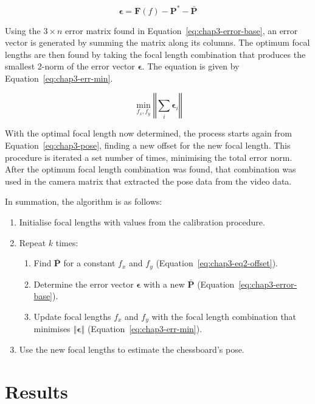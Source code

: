\begin{equation}
  \label{eq:chap3-error-base}
  \bm{\epsilon} = \bm{F}(f) - \bm{P}^* - \bar{\bm{P}}
\end{equation}

Using the $3\times n$ error matrix found in Equation~\ref{eq:chap3-error-base}, an error vector is generated by summing the matrix along its columns. The optimum focal lengths are then found by taking the focal length combination that produces the smallest 2-norm of the error vector $\bm{\epsilon}$. The equation is given by Equation~\ref{eq:chap3-err-min}.

\begin{equation}
  \label{eq:chap3-err-min}
  \min_{f_x, f_y}\left \Vert \sum_i  \bm{\epsilon}_i \right \Vert
\end{equation}

With the optimal focal length now determined, the process starts again from Equation~\ref{eq:chap3-pose}, finding a new offset for the new focal length. This procedure is iterated a set number of times, minimising the total error norm. After the optimum focal length combination was found, that combination was used in the camera matrix that extracted the pose data from the video data.

In summation, the algorithm is as follows:

\begin{enumerate}
  \item Initialise focal lengths with values from the calibration procedure. 
  \item Repeat $k$ times:
  \begin{enumerate}
    \item Find $\bar{\bm{P}}$ for a constant $f_x$ and $f_y$ (Equation~\ref{eq:chap3-eq2-offset}).
    \item Determine the error vector $\bm{\epsilon}$ with a new $\bar{\bm{P}}$ (Equation~\ref{eq:chap3-error-base}).
    \item Update focal lengths $f_x$ and $f_y$ with the focal length combination that minimises $\left \Vert \bm{\epsilon} \right \Vert$ (Equation~\ref{eq:chap3-err-min}).
  \end{enumerate}
  \item Use the new focal lengths to estimate the chessboard's pose.
\end{enumerate}

\section{Results}

